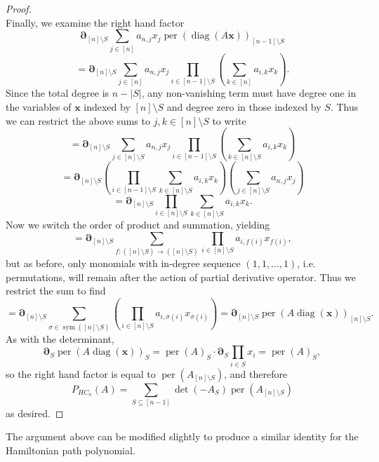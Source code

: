 \documentclass{article}
\newcommand{\diag}{\operatorname{diag}}
\newcommand{\per}{\operatorname{per}}
\newcommand{\sym}{\operatorname{sym}}
\theoremstyle{theorem}
\theoremstyle{definition}
\begin{document}
\begin{proof}
\[    \]
    Finally, we examine the right hand factor
    \[
        \boldsymbol{\partial}_{[n]\setminus S}\sum_{j\in[n]}a_{n,j}x_j\per(\diag(A\boldsymbol{x}))_{[n-1]\setminus S}
    \]
    \[
        =\boldsymbol{\partial}_{[n]\setminus S}\sum_{j\in[n]}a_{n,j}x_j\prod_{i\in[n-1]\setminus S}\left(\sum_{k\in[n]}a_{i,k}x_{k}\right).
    \]
    Since the total degree is $n-|S|$, any non-vanishing term must have degree one in the variables of $\boldsymbol{x}$ indexed by $[n]\setminus S$ and degree zero in those indexed by $S$. Thus we can restrict the above sums to $j,k\in[n]\setminus S$ to write
    \[
        =\boldsymbol{\partial}_{[n]\setminus S}\sum_{j\in[n]\setminus S}a_{n,j}x_j\prod_{i\in[n-1]\setminus S}\left(\sum_{k\in[n]\setminus S}a_{i,k}x_{k}\right)
    \]
    \[
        =\boldsymbol{\partial}_{[n]\setminus S}\left(\prod_{i\in[n-1]\setminus S}\sum_{k\in[n]\setminus S}a_{i,k}x_{k}\right)\left(\sum_{j\in[n]\setminus S}a_{n,j}x_j\right)
    \]
    \[
        =\boldsymbol{\partial}_{[n]\setminus S}\prod_{i\in[n]\setminus S}\sum_{k\in[n]\setminus S}a_{i,k}x_{k}.
    \]
    Now we switch the order of product and summation, yielding
    \[
        =\boldsymbol{\partial}_{[n]\setminus S}\sum_{f:([n]\setminus S)\rightarrow([n]\setminus S)}\prod_{i\in[n]\setminus S}a_{i,f(i)}x_{f(i)},
    \]
    but as before, only monomials with in-degree sequence $(1,1,\hdots,1)$, i.e. permutations, will remain after the action of partial derivative operator. Thus we restrict the sum to find
    \[
        =\boldsymbol{\partial}_{[n]\setminus S}\sum_{\sigma\in\sym([n]\setminus S)}\left(\prod_{i\in[n]\setminus S}a_{i,\sigma(i)}x_{\sigma(i)}\right) =\boldsymbol{\partial}_{[n]\setminus S}\per(A\diag(\boldsymbol{x}))_{[n]\setminus S}.
    \]
    As with the determinant, 
    \[
        \boldsymbol{\partial}_{S}\per(A\diag(\boldsymbol{x}))_S=\per(A)_S\cdot\boldsymbol{\partial}_{S}\prod_{i\in S}x_i=\per(A)_S,
    \]
    so the right hand factor is equal to $\per(A_{[n]\setminus S})$, and therefore
    \[
        P_{HC_n}(A)=\sum_{S\subseteq[n-1]}\det(-A_S)\per(A_{[n]\setminus S})
    \]
    as desired.
\end{proof}

The argument above can be modified slightly to produce a similar identity for the Hamiltonian path polynomial.
\end{document}
